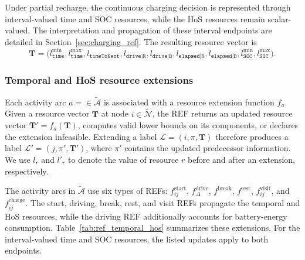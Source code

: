 \documentclass[3p,11pt,authoryear]{elsarticle}  %
\begin{document}
Under partial recharge, the continuous charging decision is represented
through interval-valued time and SOC resources, while the HoS resources
remain scalar-valued. The interpretation and propagation of these
interval endpoints are detailed in Section~\ref{sec:charging_ref}. The resulting resource vector is
\[
\mathbf{T}=
\bigl(
l_{\texttt{time}}^{\min},
l_{\texttt{time}}^{\max},
l_{\texttt{timeToNext}},
l_{\texttt{drive|R}},
l_{\texttt{drive|B}},
l_{\texttt{elapsed|R}},
l_{\texttt{elapsed|B}},
l_{\texttt{SOC}}^{\min},
l_{\texttt{SOC}}^{\max}
\bigr).
\]



\subsubsection{Temporal and HoS resource extensions}

Each activity arc \(a=\in\mathcal{\widetilde{A}}\) is associated with a resource extension function \(f_a\). Given a resource vector \(\mathbf{T}\) at node \(i\in\mathcal{\widetilde{N}}\), the REF returns an updated resource vector \(\mathbf{T}'=f_a(\mathbf{T})\), computes valid lower bounds on its components, or declares the extension infeasible. Extending a label \(\mathcal{L}=(i,\pi,\mathbf{T})\) therefore produces a label \(\mathcal{L}'=(j,\pi',\mathbf{T}')\), where \(\pi'\) contains the updated predecessor information. We use \(l_r\) and \(l'_r\) to denote the value of resource \(r\) before and after an extension, respectively.

The activity arcs in \(\mathcal{\widetilde{A}}\) use six types of REFs: \(f^{\mathrm{start}}_{ij}\), \(f^{\mathrm{drive}}_{\Delta}\), \(f^{\mathrm{break}}\), \(f^{\mathrm{rest}}\), \(f^{\mathrm{visit}}_{ij}\), and \(f^{\mathrm{charge}}_{ij}\). 
The start, driving, break, rest, and visit REFs propagate the temporal and HoS resources, while the driving REF additionally accounts for battery-energy consumption. Table~\ref{tab:ref_temporal_hos} summarizes these extensions. For the interval-valued time and SOC resources, the listed updates apply to both endpoints.
\end{document}
